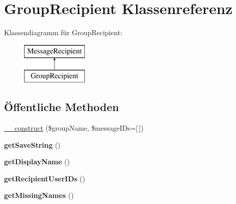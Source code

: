 \hypertarget{class_group_recipient}{}\section{Group\+Recipient Klassenreferenz}
\label{class_group_recipient}
Klassendiagramm für Group\+Recipient\+:\begin{figure}[H]
\begin{center}
\leavevmode
\includegraphics[height=2.000000cm]{class_group_recipient}
\end{center}
\end{figure}
\subsection*{Öffentliche Methoden}
\begin{DoxyCompactItemize}
\item 
\mbox{\hyperlink{class_group_recipient_a758a9455b296502ea506ced2a267ad02}{\+\_\+\+\_\+construct}} (\$group\+Name, \$message\+I\+Ds=\mbox{[}$\,$\mbox{]})
\item 
\mbox{\label{class_group_recipient_a5388bf1d29a4011062cafb661a62a8a6}} 
{\bfseries get\+Save\+String} ()
\item 
\mbox{\label{class_group_recipient_abbd39e7ba8a0540af94ebcbe3ac543c0}} 
{\bfseries get\+Display\+Name} ()
\item 
\mbox{\label{class_group_recipient_a26234497a1dc2506c4e546aecfc4db4d}} 
{\bfseries get\+Recipient\+User\+I\+Ds} ()
\item 
\mbox{\label{class_group_recipient_a68bebf923f0faa9262cd2d6ffdee4d15}} 
{\bfseries get\+Missing\+Names} ()
\end{DoxyCompactItemize}
